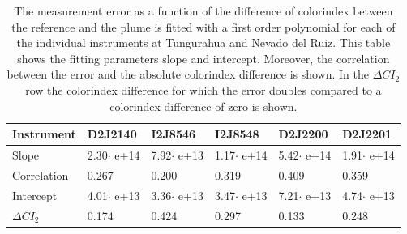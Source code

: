 \begin{table}[h]
	\centering
	\begin{tabular}{|p{2cm}|p{2cm}|p{2cm}|p{2cm}|p{2cm}|p{2cm}|}
		Instrument	&D2J2140&I2J8546& I2J8548&D2J2200&D2J2201\\
		\toprule
		Slope&2.30$\cdot$ e+14 &7.92$\cdot$ e+13 &1.17$\cdot$ e+14 &5.42$\cdot$ e+14&1.91$\cdot$ e+14\\
		\midrule
		Correlation&
		0.267&
		0.200&
		0.319&
		0.409&
		0.359\\
		\midrule
		Intercept&4.01$\cdot$ e+13&3.36$\cdot$ e+13&3.47$\cdot$ e+13& 7.21$\cdot$ e+13& 4.74$\cdot$ e+13\\
		\midrule
		$\Delta CI_{2}$&0.174&0.424&0.297&0.133&0.248\\
		\bottomrule
	\end{tabular}
	\caption{The  measurement error as a function of the difference of colorindex between the reference and the plume is fitted with a first order polynomial for each of the individual instruments at Tungurahua and Nevado del Ruiz. This table shows the fitting parameters slope and intercept. Moreover, the correlation between the  error and the absolute colorindex difference is shown. In the $\Delta CI_{2}$ row the colorindex difference for which the error doubles compared to a colorindex difference of zero is shown.}
	\label{tab:colidxcalc}
\end{table}

